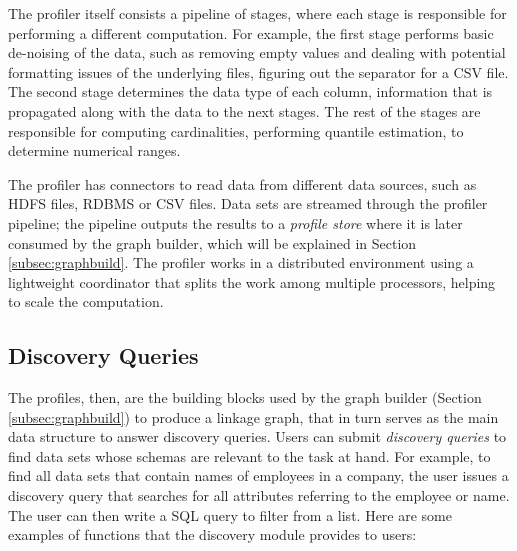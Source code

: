The profiler itself consists a pipeline of stages, where each stage is
responsible for performing a different computation. For example, the first stage
performs basic de-noising of the data, such as removing empty values and dealing
with potential formatting issues of the underlying files, \eg figuring out the
separator for a CSV file.  The second stage determines the data type of each
column, information that is propagated along with the data to the next stages.
The rest of the stages are responsible for computing cardinalities, performing
quantile estimation, \eg to determine numerical ranges.

The profiler has connectors to read data from different data sources, such as
HDFS files, RDBMS or CSV files. Data sets are streamed through the profiler
pipeline;  the pipeline outputs the results
to a {\it profile store} where it is later consumed by the graph builder, which
will be explained in Section \ref{subsec:graphbuild}.
The profiler works in a distributed environment using a lightweight coordinator
that splits the work among multiple processors, helping to scale the
computation.


\subsection{Discovery Queries}
\label{subsec:api}

The profiles, then, are the building blocks used by the graph builder (Section
\ref{subsec:graphbuild}) to produce a linkage graph, that in turn serves as the
main data structure to answer discovery queries. Users can submit
\emph{discovery queries} to find data sets whose schemas are relevant to the
task at hand. For example, to find all data sets that contain names of employees
in a company, the user issues a discovery query that searches for all attributes
referring to the employee or name. The user can then write a SQL query to filter
from a list. Here are some examples of functions that the discovery module
provides to users:

